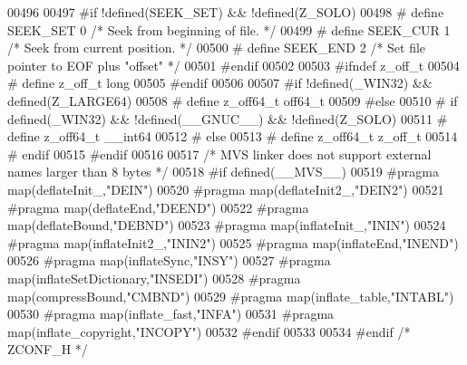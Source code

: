 \begin{DoxyCode}
00496 
00497 \textcolor{preprocessor}{#if !defined(SEEK\_SET) && !defined(Z\_SOLO)}
00498 \textcolor{preprocessor}{#  define SEEK\_SET        0       }\textcolor{comment}{/* Seek from beginning of file.  */}\textcolor{preprocessor}{}
00499 \textcolor{preprocessor}{#  define SEEK\_CUR        1       }\textcolor{comment}{/* Seek from current position.  */}\textcolor{preprocessor}{}
00500 \textcolor{preprocessor}{#  define SEEK\_END        2       }\textcolor{comment}{/* Set file pointer to EOF plus "offset" */}\textcolor{preprocessor}{}
00501 \textcolor{preprocessor}{#endif}
00502 
00503 \textcolor{preprocessor}{#ifndef z\_off\_t}
00504 \textcolor{preprocessor}{#  define z\_off\_t long}
00505 \textcolor{preprocessor}{#endif}
00506 
00507 \textcolor{preprocessor}{#if !defined(\_WIN32) && defined(Z\_LARGE64)}
00508 \textcolor{preprocessor}{#  define z\_off64\_t off64\_t}
00509 \textcolor{preprocessor}{#else}
00510 \textcolor{preprocessor}{#  if defined(\_WIN32) && !defined(\_\_GNUC\_\_) && !defined(Z\_SOLO)}
00511 \textcolor{preprocessor}{#    define z\_off64\_t \_\_int64}
00512 \textcolor{preprocessor}{#  else}
00513 \textcolor{preprocessor}{#    define z\_off64\_t z\_off\_t}
00514 \textcolor{preprocessor}{#  endif}
00515 \textcolor{preprocessor}{#endif}
00516 
00517 \textcolor{comment}{/* MVS linker does not support external names larger than 8 bytes */}
00518 \textcolor{preprocessor}{#if defined(\_\_MVS\_\_)}
00519 \textcolor{preprocessor}{  #pragma map(deflateInit\_,"DEIN")}
00520 \textcolor{preprocessor}{  #pragma map(deflateInit2\_,"DEIN2")}
00521 \textcolor{preprocessor}{  #pragma map(deflateEnd,"DEEND")}
00522 \textcolor{preprocessor}{  #pragma map(deflateBound,"DEBND")}
00523 \textcolor{preprocessor}{  #pragma map(inflateInit\_,"ININ")}
00524 \textcolor{preprocessor}{  #pragma map(inflateInit2\_,"ININ2")}
00525 \textcolor{preprocessor}{  #pragma map(inflateEnd,"INEND")}
00526 \textcolor{preprocessor}{  #pragma map(inflateSync,"INSY")}
00527 \textcolor{preprocessor}{  #pragma map(inflateSetDictionary,"INSEDI")}
00528 \textcolor{preprocessor}{  #pragma map(compressBound,"CMBND")}
00529 \textcolor{preprocessor}{  #pragma map(inflate\_table,"INTABL")}
00530 \textcolor{preprocessor}{  #pragma map(inflate\_fast,"INFA")}
00531 \textcolor{preprocessor}{  #pragma map(inflate\_copyright,"INCOPY")}
00532 \textcolor{preprocessor}{#endif}
00533 
00534 \textcolor{preprocessor}{#endif }\textcolor{comment}{/* ZCONF\_H */}\textcolor{preprocessor}{}
\end{DoxyCode}
